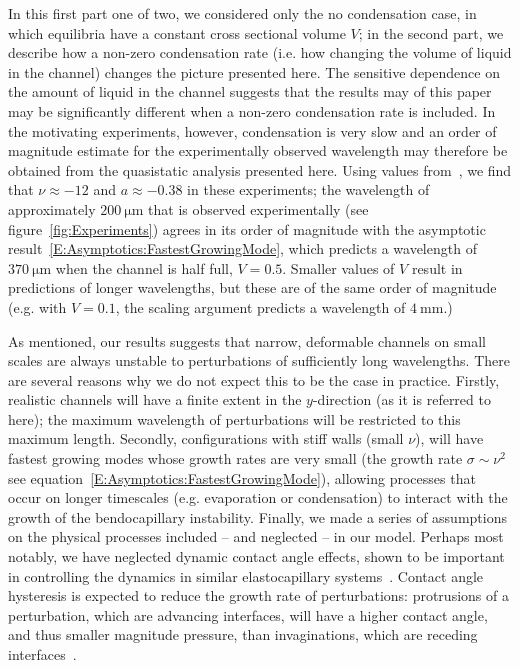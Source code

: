 \documentclass{jfm}
\newcommand{\aspect}{a} %
\begin{document}
In this first part one of two, we considered only the no condensation case, in which equilibria have a constant cross sectional volume $V$; in the second part, we describe how a non-zero condensation rate (i.e. how changing the volume of liquid in the channel) changes the picture presented here. The sensitive dependence on the amount of liquid in the channel suggests that the results may of this paper may be significantly different when a non-zero condensation rate is included. In the motivating experiments, however, condensation is very slow and an order of magnitude estimate for the experimentally observed wavelength may therefore be obtained from the quasistatic analysis presented here. Using values from~\cite{Seemann2011JPhysCondMat}, we find that $\nu \approx -12$ and $\aspect \approx -0.38$ in these experiments; the wavelength of approximately $200~\si{\micro \meter}$ that is observed experimentally (see figure~\ref{fig:Experiments}) agrees in its order of magnitude with the asymptotic result~\eqref{E:Asymptotics:FastestGrowingMode}, which predicts a wavelength of $370~\si{\micro \meter}$ when the channel is half full, $V = 0.5$. Smaller values of $V$ result in predictions of longer wavelengths, but these are of the same order of magnitude (e.g. with $V = 0.1$, the scaling argument predicts a wavelength of $4~\si{\milli \meter}$.) 

As mentioned, our results suggests that narrow, deformable channels on small scales are always unstable to perturbations of sufficiently long wavelengths. There are several reasons why we do not expect this to be the case in practice. Firstly, realistic channels will have a finite extent in the $y$-direction (as it is referred to here); the maximum wavelength of perturbations will be restricted to this maximum length. Secondly, configurations with stiff walls (small $\nu$), will have fastest growing modes whose growth rates are very small (the growth rate $\sigma \sim \nu^2$ see equation~\eqref{E:Asymptotics:FastestGrowingMode}), allowing processes that occur on longer timescales (e.g. evaporation or condensation) to interact with the growth of the bendocapillary instability. Finally, we made a series of assumptions on the physical processes included -- and neglected -- in our model. Perhaps most notably, we have neglected dynamic contact angle effects, shown to be important in controlling the dynamics in similar elastocapillary systems~\citep{Bradley2021}. Contact angle hysteresis is expected to reduce the growth rate of perturbations: protrusions of a perturbation, which are advancing interfaces, will have a higher contact angle, and thus smaller magnitude pressure, than invaginations, which are receding interfaces~\citep{Bradley2021}.
\end{document}
